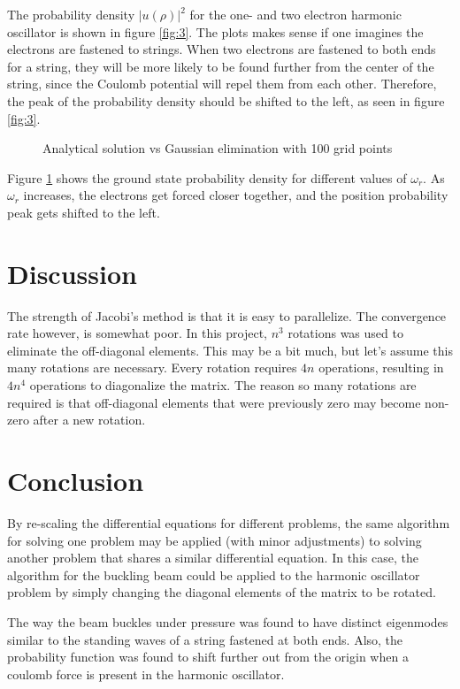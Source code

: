 \documentclass[a4paper,11pt]{article}
\begin{document}
The probability density $|u(\rho)|^2$ for the one- and two electron harmonic oscillator is shown in figure \ref{fig:3}. The plots makes sense if one imagines the electrons are fastened to strings. When two electrons are fastened to both ends for a string, they will be more likely to be found further from the center of the string, since the Coulomb potential will repel them from each other. Therefore, the peak of the probability density should be shifted to the left, as seen in figure \ref{fig:3}. 



\begin{figure}[H]
%
  \caption{Analytical solution vs Gaussian elimination with 100 grid points}
  \label{fig:4}
\end{figure}

Figure \ref{fig:4} shows the ground state probability density for different values of $\omega_r$. As $\omega_r$ increases, the electrons get forced closer together, and the position probability peak gets shifted to the left. 

\section{Discussion}
The strength of Jacobi's method is that it is easy to parallelize. The convergence rate however, is somewhat poor. In this project, $n^3$ rotations was used to eliminate the off-diagonal elements. This may be a bit much, but let's assume this many rotations are necessary. Every rotation requires $4n$ operations, resulting in $4n^4$ operations to diagonalize the matrix. The reason so many rotations are required is that off-diagonal elements that were previously zero may become non-zero after a new rotation. 

\section{Conclusion}
By re-scaling the differential equations for different problems, the same algorithm for solving one problem may be applied (with minor adjustments) to solving another problem that shares a similar differential equation. In this case, the algorithm for the buckling beam could be applied to the harmonic oscillator problem by simply changing the diagonal elements of the matrix to be rotated. 

The way the beam buckles under pressure was found to have distinct eigenmodes similar to the standing waves of a string fastened at both ends. Also, the probability function was found to shift further out from the origin when a coulomb force is present in the harmonic oscillator. 

\printbibliography
\end{document}
